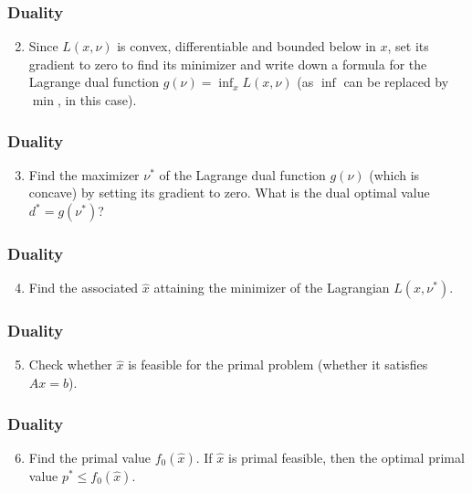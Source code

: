 \documentclass{beamer}
\begin{document}
\begin{frame}[t] 
\frametitle{Duality}
\vspace{-5pt}
\begin{enumerate}
\setcounter{enumi}{1}
\item Since $L(x,\nu)$ is convex, differentiable and bounded below in $x$, set its gradient to zero to find its minimizer and write down a formula for the Lagrange dual function $g(\nu) = \inf_x L(x,\nu)$ (as $\inf$ can be replaced by $\min$, in this case).
\end{enumerate}
\end{frame}

\begin{frame}[t] 
\frametitle{Duality}
\vspace{-5pt}
\begin{enumerate}
\setcounter{enumi}{2}
\item Find the maximizer $\nu^*$ of the Lagrange dual function $g(\nu)$ (which is concave) by setting its
gradient to zero. What is the dual optimal value $d^* = g(\nu^*)$?
\end{enumerate}
\end{frame}

\begin{frame}[t] 
\frametitle{Duality}
\vspace{-5pt}
\begin{enumerate}
\setcounter{enumi}{3}
\item Find the associated $\hat{x}$ attaining the minimizer of the Lagrangian $L(x, \nu^*)$.
\end{enumerate}
\end{frame}

\begin{frame}[t] 
\frametitle{Duality}
\vspace{-5pt}
\begin{enumerate}
\setcounter{enumi}{4}
\item Check whether $\hat{x}$ is feasible for the primal problem (whether it satisfies $Ax = b$).
\end{enumerate}
\end{frame}

\begin{frame}[t] 
\frametitle{Duality}
\vspace{-5pt}
\begin{enumerate}
\setcounter{enumi}{5}
\item Find the primal value $f_0(\hat{x})$. If $\hat{x}$ is primal feasible, then the optimal primal value $p^* \leq f_0(\hat{x})$.
\end{enumerate}
\end{frame}
\end{document}
